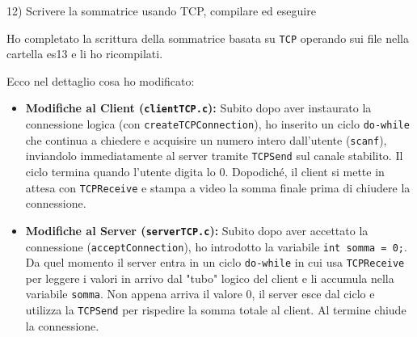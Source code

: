 \documentclass[11pt]{article}
\begin{document}
\begin{tcolorbox}[colback=blue!5!white,colframe=blue!75!black,title=\textbf{DOMANDA}, breakable]
12) Scrivere la sommatrice usando TCP, compilare ed eseguire
\end{tcolorbox}

\begin{tcolorbox}[colback=green!5!white,colframe=green!75!black,title=\textbf{RISPOSTA}, breakable]
Ho completato la scrittura della sommatrice basata su \texttt{TCP} operando sui file nella cartella es13 e li ho ricompilati.

Ecco nel dettaglio cosa ho modificato:

\begin{itemize}
    \item \textbf{Modifiche al Client (\texttt{clientTCP.c}):} Subito dopo aver instaurato la connessione logica (con \texttt{createTCPConnection}), ho inserito un ciclo \texttt{do-while} che continua a chiedere e acquisire un numero intero dall'utente (\texttt{scanf}), inviandolo immediatamente al server tramite \texttt{TCPSend} sul canale stabilito. Il ciclo termina quando l'utente digita lo 0. Dopodiché, il client si mette in attesa con \texttt{TCPReceive} e stampa a video la somma finale prima di chiudere la connessione.
    
    \item \textbf{Modifiche al Server (\texttt{serverTCP.c}):} Subito dopo aver accettato la connessione (\texttt{acceptConnection}), ho introdotto la variabile \texttt{int somma = 0;}. Da quel momento il server entra in un ciclo \texttt{do-while} in cui usa \texttt{TCPReceive} per leggere i valori in arrivo dal "tubo" logico del client e li accumula nella variabile \texttt{somma}. Non appena arriva il valore 0, il server esce dal ciclo e utilizza la \texttt{TCPSend} per rispedire la somma totale al client. Al termine chiude la connessione.
\end{itemize}
\end{tcolorbox}
\end{document}
